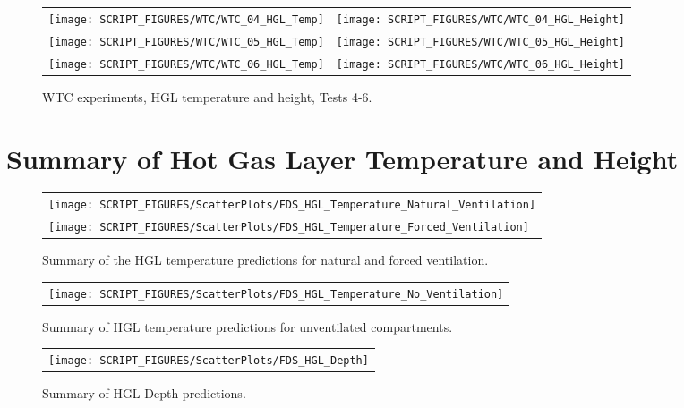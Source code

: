 \begin{figure}[p]
\begin{tabular*}{\textwidth}{l@{\extracolsep{\fill}}r}
\texttt{[image: SCRIPT\_FIGURES/WTC/WTC\_04\_HGL\_Temp]} &
\texttt{[image: SCRIPT\_FIGURES/WTC/WTC\_04\_HGL\_Height]} \\
\texttt{[image: SCRIPT\_FIGURES/WTC/WTC\_05\_HGL\_Temp]} &
\texttt{[image: SCRIPT\_FIGURES/WTC/WTC\_05\_HGL\_Height]} \\
\texttt{[image: SCRIPT\_FIGURES/WTC/WTC\_06\_HGL\_Temp]} &
\texttt{[image: SCRIPT\_FIGURES/WTC/WTC\_06\_HGL\_Height]}
\end{tabular*}
\caption[WTC experiments, HGL temperature and height, Tests 4-6]
{WTC experiments, HGL temperature and height, Tests 4-6.}
\label{WTC_HGL_2}
\end{figure}

\clearpage


\section{Summary of Hot Gas Layer Temperature and Height}
\label{HGL Temperature, Natural Ventilation}
\label{HGL Temperature, Forced Ventilation}
\label{HGL Temperature, No Ventilation}
\label{HGL Depth}


\begin{figure}[!h]
\centering
\begin{tabular}{l}
\texttt{[image: SCRIPT\_FIGURES/ScatterPlots/FDS\_HGL\_Temperature\_Natural\_Ventilation]} \\
\texttt{[image: SCRIPT\_FIGURES/ScatterPlots/FDS\_HGL\_Temperature\_Forced\_Ventilation]}
\end{tabular}
\caption[Summary of HGL temperature predictions for natural and forced ventilation]
{Summary of the HGL temperature predictions for natural and forced ventilation.}
\label{HGL_Summary_1}
\end{figure}

\begin{figure}[!h]
\begin{center}
\begin{tabular}{l}
\texttt{[image: SCRIPT\_FIGURES/ScatterPlots/FDS\_HGL\_Temperature\_No\_Ventilation]}
\end{tabular}
\end{center}
\caption[Summary of HGL temperature for unventilated compartments]
{Summary of HGL temperature predictions for unventilated compartments.}
\label{HGL_Summary_2}
\end{figure}

\begin{figure}[!h]
\begin{center}
\begin{tabular}{l}
\texttt{[image: SCRIPT\_FIGURES/ScatterPlots/FDS\_HGL\_Depth]}
\end{tabular}
\end{center}
\caption[Summary of HGL Depth predictions]
{Summary of HGL Depth predictions.}
\label{HGL_Depth}
\end{figure}


